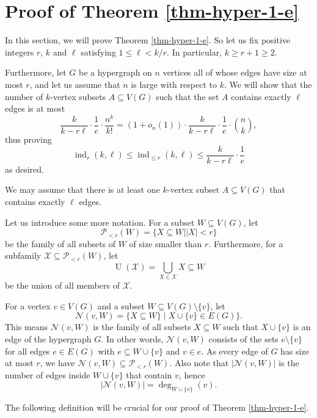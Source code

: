 \section{Proof of Theorem \ref{thm-hyper-1-e}}\label{sect-hyper-1-e}

In this section, we will prove Theorem \ref{thm-hyper-1-e}. So let us fix positive integers $r$, $k$ and $\ell$ satisfying $1\leq \ell<k/r$. In particular, $k\geq r+1\geq 2$.

Furthermore, let $G$ be a hypergraph on $n$ vertices all of whose edges have size at most $r$, and let us assume that $n$ is large with respect to $k$. We will show that the number of $k$-vertex subsets $A\subseteq V(G)$ such that the set $A$ contains exactly $\ell$ edges is at most
\[\frac{k}{k-r\ell}\cdot \frac{1}{e}\cdot \frac{n^k}{k!}=(1+o_n(1))\cdot\frac{k}{k-r\ell}\cdot \frac{1}{e}\cdot {n\choose k},\]
thus proving
\[\operatorname{ind}_{r}(k,\ell)\leq \operatorname{ind}_{\leq r}(k,\ell)\leq \frac{k}{k-r\ell}\cdot \frac{1}{e}\]
as desired.

We may assume that there is at least one $k$-vertex subset $A\subseteq V(G)$ that contains exactly $\ell$ edges.

Let us introduce some more notation. For a subset $W\subseteq V(G)$, let
\[\mathcal{P}\!_{<r}(W)=\lbrace X\subseteq W\mid \vert X\vert<r\rbrace\]
be the family of all subsets of $W$ of size smaller than $r$. Furthermore, for a subfamily $\mathcal{X}\subseteq \mathcal{P}\!_{<r}(W)$, let
\[\operatorname{U}(\mathcal{X})=\bigcup_{X\in \mathcal{X}}X\subseteq W\]
be the union of all members of $\mathcal{X}$.

For a vertex $v\in V(G)$ and a subset $W\subseteq V(G)\setminus \lbrace v\rbrace$, let
\[\mathcal{N}(v,W)=\lbrace X \subseteq W\rbrace\mid X\cup \lbrace v\rbrace\in E(G)\rbrace.\]
This means $\mathcal{N}(v,W)$ is the family of all subsets $X\subseteq W$ such that $X\cup \lbrace v\rbrace$ is an edge of the hypergraph $G$. In other words, $\mathcal{N}(v,W)$ consists of the sets $e\setminus \lbrace v\rbrace$ for all edges $e\in E(G)$ with $e\subseteq W\cup \lbrace v\rbrace$ and $v\in e$. As every edge of $G$ has size at most $r$, we have $\mathcal{N}(v,W)\subseteq \mathcal{P}\!_{<r}(W)$. Also note that $\vert \mathcal{N}(v,W)\vert$ is the number of edges inside $W\cup \lbrace v\rbrace$ that contain $v$, hence
\[\vert \mathcal{N}(v,W)\vert=\deg_{W\cup \lbrace v\rbrace}(v).\]

The following definition will be crucial for our proof of Theorem \ref{thm-hyper-1-e}.

